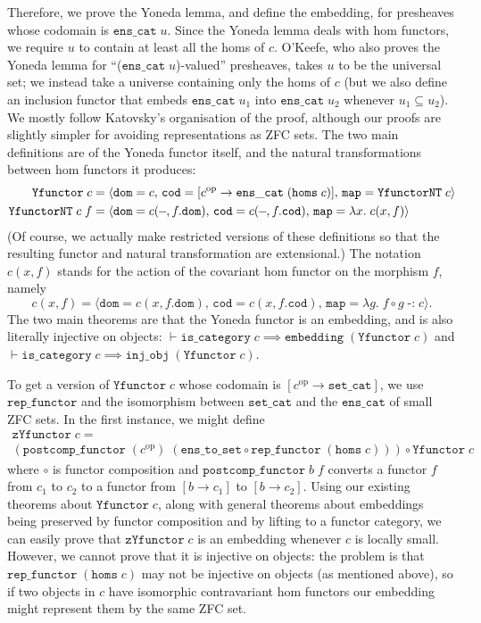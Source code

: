 \documentclass[twoside,titlepage,11pt]{article}
\begin{document}
Therefore, we prove the Yoneda lemma, and define the embedding, for presheaves whose codomain is $\mathtt{ens\_cat}\;u$.
Since the Yoneda lemma deals with hom functors, we require $u$ to contain at least all the homs of $c$.
O'Keefe, who also proves the Yoneda lemma for ``($\mathtt{ens\_cat}\;u$)-valued'' presheaves, takes $u$ to be the universal set; we instead take a universe containing only the homs of $c$ (but we also define an inclusion functor that embeds $\mathtt{ens\_cat}\;u_1$ into $\mathtt{ens\_cat}\;u_2$ whenever $u_1\subseteq u_2$).
We mostly follow Katovsky's organisation of the proof, although our proofs are slightly simpler for avoiding representations as ZFC sets.
The two main definitions are of the Yoneda functor itself, and the natural transformations between hom functors it produces:
\begin{align*}
\mathtt{Yfunctor}\;c&=\langle\mathtt{dom}=c,\,\mathtt{cod}=[c\op\to\mathtt{ens\_cat}\;(\mathtt{homs}\;c)],\,\mathtt{map}=\mathtt{YfunctorNT}\;c\rangle\\
\mathtt{YfunctorNT}\;c\;f&=\langle\mathtt{dom}=c(\blank,f.\mathtt{dom}),\,\mathtt{cod}=c(\blank,f.\mathtt{cod}),\,\mathtt{map}=\lambda{x}.\;c(x,f)\rangle
\end{align*}
(Of course, we actually make restricted versions of these definitions so that the resulting functor and natural transformation are extensional.)
The notation $c(x,f)$ stands for the action of the covariant hom functor on the morphism $f$, namely \[c(x,f)=\langle\mathtt{dom}=c(x,f.\mathtt{dom}),\,\mathtt{cod}=c(x,f.\mathtt{cod}),\,\mathtt{map}=\lambda{g}.\;f\circ g\operatorname{\mathtt{-:}}c\rangle\text{.}\]
The two main theorems are that the Yoneda functor is an embedding, and is also literally injective on objects: $\vdash\mathtt{is\_category}\;c\implies\mathtt{embedding}\;(\mathtt{Yfunctor}\;c)$ and $\vdash\mathtt{is\_category}\;c\implies\mathtt{inj\_obj}\;(\mathtt{Yfunctor}\;c)$.

To get a version of $\mathtt{Yfunctor}\;c$ whose codomain is $[c^\mathrm{op}\to\mathtt{set\_cat}]$, we use $\mathtt{rep\_functor}$ and the isomorphism between $\mathtt{set\_cat}$ and the $\mathtt{ens\_cat}$ of small ZFC sets.
In the first instance, we might define
\begin{multline*}
\mathtt{zYfunctor}\;c=\\(\mathtt{postcomp\_functor}\;(c^\mathrm{op})\;(\mathtt{ens\_to\_set}\circ\mathtt{rep\_functor}\;(\mathtt{homs}\;c)))\circ\mathtt{Yfunctor}\;c
\end{multline*}
where $\circ$ is functor composition and $\mathtt{postcomp\_functor}\;b\;f$ converts a functor $f$ from $c_1$ to $c_2$ to a functor from $[b\to c_1]$ to $[b\to c_2]$.
Using our existing theorems about $\mathtt{Yfunctor}\;c$, along with general theorems about embeddings being preserved by functor composition and by lifting to a functor category, we can easily prove that $\mathtt{zYfunctor}\;c$ is an embedding whenever $c$ is locally small.
However, we cannot prove that it is injective on objects: the problem is that $\mathtt{rep\_functor}\;(\mathtt{homs}\;c)$ may not be injective on objects (as mentioned above), so if two objects in $c$ have isomorphic contravariant hom functors our embedding might represent them by the same ZFC set.
\end{document}
